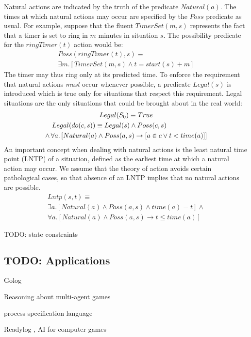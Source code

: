 Natural actions are indicated by the truth of the predicate $Natural(a)$.
The times at which natural actions may occur are specified by the
$Poss$ predicate as usual. For example, suppose that the fluent $TimerSet(m,s)$
represents the fact that a timer is set to ring in $m$ minutes in
situation $s$. The possibility predicate for the $ringTimer(t)$
action would be:\begin{multline*}
Poss(ringTimer(t),s)\equiv\\
\exists m.\left[TimerSet(m,s)\wedge t=start(s)+m\right]\end{multline*}
 The timer may thus ring only at its predicted time. To enforce the
requirement that natural actions \emph{must} occur whenever possible,
a predicate $Legal(s)$ is introduced which is true only for situations
that respect this requirement. Legal situations are the only situations
that could be brought about in the real world:\begin{multline*}
Legal(S_{0})\equiv True\\
\shoveleft{Legal(do(c,s))\equiv Legal(s)\wedge Poss(c,s)}\\
\wedge\,\forall a.\left[Natural(a)\wedge Poss(a,s)\rightarrow\left[a\in c\vee t<time(a)\right]\right]\end{multline*}
 An important concept when dealing with natural actions is the least
natural time point (LNTP) of a situation, defined as the earliest
time at which a natural action may occur. We assume that the theory
of action avoids certain pathological cases, so that absence of an
LNTP implies that no natural actions are possible.\begin{multline*}
Lntp(s,t)\equiv\\
\exists a.\left[Natural(a)\wedge Poss(a,s)\wedge time(a)=t\right]\wedge\\
\forall a.\left[Natural(a)\wedge Poss(a,s)\rightarrow t\leq time(a)\right]\end{multline*}


TODO: state constraints


\subsection{TODO: Applications}

Golog

Reasoning about multi-agent games \citep{delgrande01sitcalc_cleudo}

process specification language \citep{gruninger04psl}

Readylog \citep{Ferrein2005readylog}, AI for computer games \citep{jacobs05unrealgolog}


